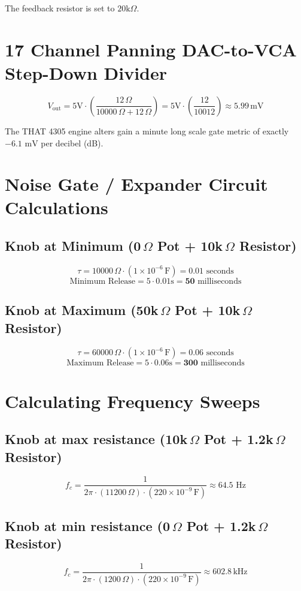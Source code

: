 \documentclass{article}
\begin{document}
	\medskip
	The feedback resistor is set to $20\text{k}\Omega$.
	
	\section*{17 Channel Panning DAC-to-VCA Step-Down Divider}
	\[ V_{\text{out}} = 5\text{V} \cdot \left( \frac{12\,\Omega}{10000\,\Omega + 12\,\Omega} \right) = 5\text{V} \cdot \left( \frac{12}{10012} \right) \approx 5.99\,\text{mV} \]
	
	\medskip
	The THAT 4305 engine alters gain a minute long scale gate metric of exactly $-6.1\text{ mV}$ per decibel (dB).
	
	\section*{Noise Gate / Expander Circuit Calculations}
	
	\subsection*{Knob at Minimum (0\,$\Omega$ Pot + 10k\,$\Omega$ Resistor)}
	\[ \tau = 10000\,\Omega \cdot (1 \times 10^{-6}\,\text{F}) = 0.01\text{ seconds} \]
	\[ \text{Minimum Release} = 5 \cdot 0.01\text{s} = \mathbf{50}\text{ milliseconds} \]
	
	\subsection*{Knob at Maximum (50k\,$\Omega$ Pot + 10k\,$\Omega$ Resistor)}
	\[ \tau = 60000\,\Omega \cdot (1 \times 10^{-6}\,\text{F}) = 0.06\text{ seconds} \]
	\[ \text{Maximum Release} = 5 \cdot 0.06\text{s} = \mathbf{300}\text{ milliseconds} \]
	
	\section*{Calculating Frequency Sweeps}
	
	\subsection*{Knob at max resistance (10k\,$\Omega$ Pot + 1.2k\,$\Omega$ Resistor)}
	\[ f_c = \frac{1}{2\pi \cdot (11200\,\Omega) \cdot (220 \times 10^{-9}\,\text{F})} \approx 64.5\text{ Hz} \]
	
	\subsection*{Knob at min resistance (0\,$\Omega$ Pot + 1.2k\,$\Omega$ Resistor)}
	\[ f_c = \frac{1}{2\pi \cdot (1200\,\Omega) \cdot (220 \times 10^{-9}\,\text{F})} \approx 602.8\,\text{kHz} \]
	
\end{document}
